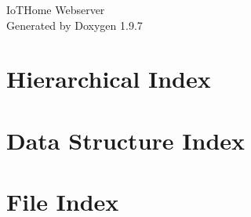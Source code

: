 \documentclass[twoside]{book}
\newcommand{\+}{\discretionary{\mbox{\scriptsize$\hookleftarrow$}}{}{}}
\newcommand{\clearemptydoublepage}{%
    \newpage{\pagestyle{empty}\cleardoublepage}%
  }
\begin{document}
  \raggedbottom
    \hypersetup{pageanchor=false,
                bookmarksnumbered=true,
                pdfencoding=unicode
               }
  \begin{titlepage}
  \vspace*{7cm}
  \begin{center}%
  {\Large Io\+THome Webserver}\\
  \vspace*{1cm}
  {\large Generated by Doxygen 1.9.7}\\
  \end{center}
  \end{titlepage}
  \clearemptydoublepage
  \tableofcontents
  \clearemptydoublepage
  \hypersetup{pageanchor=true}
\chapter{Hierarchical Index}

\chapter{Data Structure Index}

\chapter{File Index}

\end{document}
